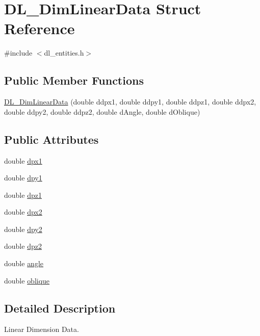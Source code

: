 \hypertarget{structDL__DimLinearData}{\section{D\-L\-\_\-\-Dim\-Linear\-Data Struct Reference}
\label{structDL__DimLinearData}
}


{\ttfamily \#include $<$dl\-\_\-entities.\-h$>$}

\subsection*{Public Member Functions}
\begin{DoxyCompactItemize}
\item 
\hyperlink{structDL__DimLinearData_a10e443b807270869b211b16d4cb0a44d}{D\-L\-\_\-\-Dim\-Linear\-Data} (double ddpx1, double ddpy1, double ddpz1, double ddpx2, double ddpy2, double ddpz2, double d\-Angle, double d\-Oblique)
\end{DoxyCompactItemize}
\subsection*{Public Attributes}
\begin{DoxyCompactItemize}
\item 
double \hyperlink{structDL__DimLinearData_a82ea128585a3707c9dfc1ed492963af6}{dpx1}
\item 
double \hyperlink{structDL__DimLinearData_ac92bccc41c8a3e1016bae89282dbc1cc}{dpy1}
\item 
double \hyperlink{structDL__DimLinearData_a5cb6180b0c69554d7c9667c2028761ed}{dpz1}
\item 
double \hyperlink{structDL__DimLinearData_a132aa83245ff50b1b4f60b60667ca5a1}{dpx2}
\item 
double \hyperlink{structDL__DimLinearData_a4076706ef2191719f778db806bc60217}{dpy2}
\item 
double \hyperlink{structDL__DimLinearData_ab81b7845a89710d5564753f8e155fa59}{dpz2}
\item 
double \hyperlink{structDL__DimLinearData_a49ff532b4d57c9b3cdff9279224f569d}{angle}
\item 
double \hyperlink{structDL__DimLinearData_a337879f59b2390829374ba59658abc7d}{oblique}
\end{DoxyCompactItemize}


\subsection{Detailed Description}
Linear Dimension Data.

